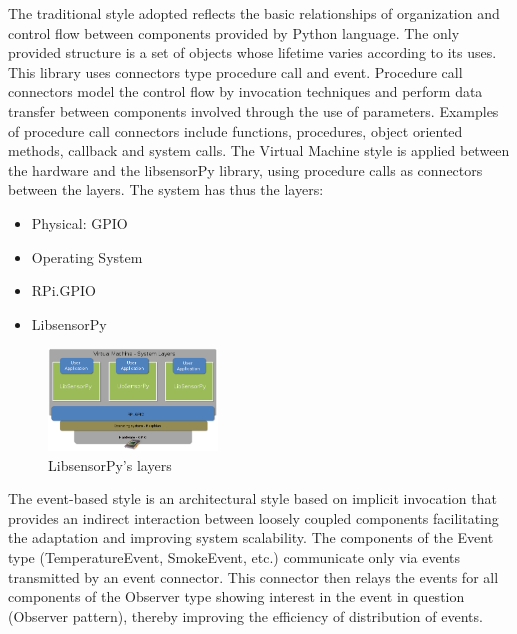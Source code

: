 \documentclass{acm_proc_article-sp}
\begin{document}
The traditional style adopted reflects the basic relationships of organization and control flow between components provided by Python language. The only provided structure is a set of objects whose lifetime varies according to its uses. This library uses connectors type procedure call and event. Procedure call connectors model the control flow by invocation techniques and perform data transfer between components involved through the use of parameters. Examples of procedure call connectors include functions, procedures,  object oriented methods, callback and system calls.
\newline
\newline
The Virtual Machine style is applied between the hardware and the libsensorPy library, using procedure calls as connectors between the layers. The system has thus the layers:
\begin{itemize}
\item Physical: GPIO
\item Operating System
\item RPi.GPIO
\item LibsensorPy
\end{itemize}

\begin{figure}[h]
\centering
    \includegraphics[width=0.4\textwidth,natwidth=610,natheight=642]{pictures/machinelayers.png}
    \caption{LibsensorPy's layers}
    \label{fig:layers}
\end{figure}

The event-based style is an architectural style based on implicit invocation that provides an indirect interaction between loosely coupled components facilitating the adaptation and improving system scalability. The components of the Event type (TemperatureEvent, SmokeEvent, etc.) communicate only via events transmitted by an event connector. This connector then relays the events for all components of the Observer type showing interest in the event in question (Observer pattern), thereby improving the efficiency of distribution of events.
\end{document}
